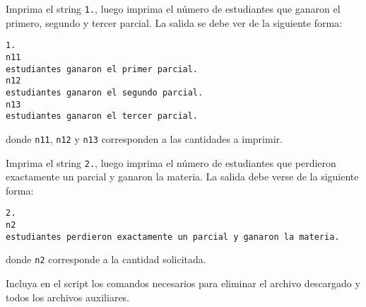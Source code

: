 \documentclass[11pt,letterpaper]{exam}
\begin{document}
\begin{questions}
 
\question[2.5]

Imprima el string \verb'1.', luego imprima el n\'umero de estudiantes que ganaron el primero, segundo y tercer parcial. La salida se debe ver de la siguiente forma:

\begin{verbatim}
1.
n11
estudiantes ganaron el primer parcial.
n12
estudiantes ganaron el segundo parcial.
n13
estudiantes ganaron el tercer parcial.
\end{verbatim}

donde \verb'n11', \verb'n12' y \verb'n13' corresponden a las cantidades a imprimir.

\question[2.0]

Imprima el string \verb'2.', luego imprima el n\'umero de estudiantes que perdieron exactamente un parcial y ganaron la materia. La salida debe verse de la siguiente forma:

\begin{verbatim}
2.
n2
estudiantes perdieron exactamente un parcial y ganaron la materia.
\end{verbatim}

donde \verb'n2' corresponde a la cantidad solicitada.

\question[0.5]

Incluya en el script los comandos necesarios para eliminar el archivo descargado y todos los archivos auxiliares.

\end{questions}
\end{document}
